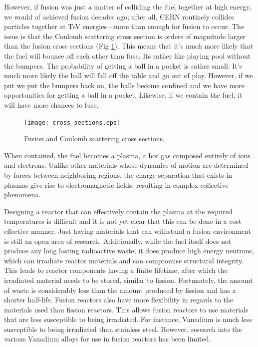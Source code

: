 However, if fusion was just a matter of colliding the fuel together at high energy, we would of achieved fusion decades ago; after all, CERN routinely collides particles together at TeV energies---more than enough for fusion to occur. The issue is that the Coulomb scattering cross section is orders of magnitude larger than the fusion cross sections (Fig \ref{fig:scattering}). This means that it's much more likely that the fuel will bounce off each other than fuse. Its rather like playing pool without the bumpers. The probability of getting a ball in a pocket is rather small. It's much more likely the ball will fall off the table and go out of play. However, if we put we put the bumpers back on, the balls become confined and we have more opportunities for getting a ball in a pocket. Likewise, if we contain the fuel, it will have more chances to fuse.
\begin{figure}[ht]
    \centering
    \texttt{[image: cross\_sections.eps]}
    \caption{Fusion and Coulomb scattering cross sections.}
    \label{fig:scattering}
\end{figure}
When contained, the fuel becomes a plasma, a hot gas composed entirely of ions and electrons. Unlike other materials whose dynamics of motion are determined by forces between neighboring regions, the charge separation that exists in plasmas give rise to electromagnetic fields, resulting in complex collective phenomena.

Designing a reactor that can effectively contain the plasma at the required temperatures is difficult and it is not yet clear that this can be done in a cost effective manner. Just having materials that can withstand a fusion environment is still an open area of research. Additionally, while the fuel itself does not produce any long lasting radioactive waste, it does produce high energy neutrons, which can irradiate reactor materials and can compromise structural integrity. This leads to reactor components having a finite lifetime, after which the irradiated material needs to be stored, similar to fission. Fortunately, the amount of waste is considerably less than the amount produced by fission and has a shorter half-life. Fusion reactors also have more flexibility in regards to the materials used than fission reactors. This allows fusion reactors to use materials that are less susceptible to being irradiated. For instance, Vanadium is much less susceptible to being irradiated than stainless steel. However, research into the various Vanadium alloys for use in fusion reactors has been limited. 

